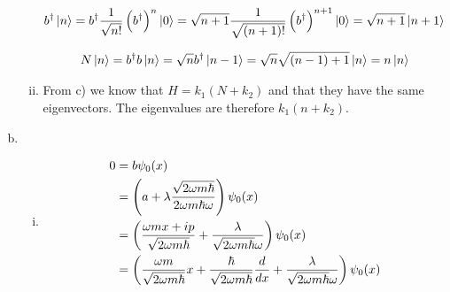\documentclass[a4paper,german,12pt,smallheadings]{scrartcl}
\begin{document}
\begin{enumerate}[a)]
\begin{enumerate}[i)]
    \begin{align*}
      b^\dagger \ket{n} 
      &= b^\dagger \frac{1}{\sqrt{n!}} \del{b^\dagger}^n \ket{0}
      = \sqrt{n+1} \frac{1}{\sqrt{(n+1)!}} \del{b^\dagger}^{n+1} \ket{0}
      = \sqrt{n+1} \ket{n+1}
    \end{align*}

    \begin{align*}
      N \ket{n} = b^\dagger b \ket{n} = \sqrt{n} b^\dagger \ket{n-1} = \sqrt{n} \sqrt{(n-1)+1} \ket{n} = n \ket{n}
    \end{align*}

  \item
    From c) we know that $H = k_1 (N + k_2)$ and that they have the same
    eigenvectors. The eigenvalues are therefore $k_1(n + k_2)$.

\end{enumerate}
\item
  \begin{enumerate}[i)]
    \item
      \begin{align*}
        0 &= b \psi_0(x) \\
          &= \del{a + \lambda \frac{\sqrt{2 \omega m \hbar}}{2 \omega m \hbar \omega}} \psi_0(x) \\
          &= \del{\frac{\omega m x + i p}{\sqrt{2 \omega m \hbar}} + \frac{\lambda}{\sqrt{2 \omega m \hbar} \omega}} \psi_0(x) \\
          &= \del{\frac{\omega m}{\sqrt{2 \omega m \hbar}} x + \frac{\hbar}{\sqrt{2 \omega m \hbar}} \frac{d}{dx} + \frac{\lambda}{\sqrt{2 \omega m \hbar} \omega}} \psi_0(x)
      \end{align*}
  \end{enumerate}

\end{enumerate}
\end{document}
